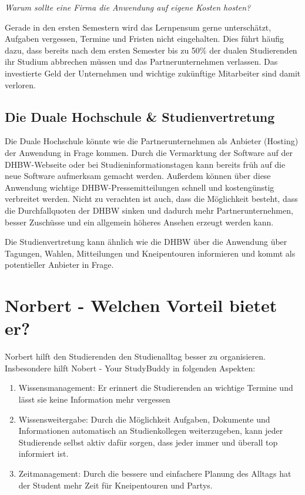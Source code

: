 \textit{Warum sollte eine Firma die Anwendung auf eigene Kosten hosten?}

Gerade in den ersten Semestern wird das Lernpensum gerne unterschätzt, Aufgaben vergessen, Termine und Fristen nicht eingehalten. Dies führt häufig dazu, dass bereits nach dem ersten Semester bis zu 50\% der dualen Studierenden ihr Studium abbrechen müssen und das Partnerunternehmen verlassen. Das investierte Geld der Unternehmen und wichtige zukünftige Mitarbeiter sind damit verloren.

\subsection{Die Duale Hochschule \& Studienvertretung}
Die Duale Hochschule könnte wie die Partnerunternehmen als Anbieter (Hosting) der Anwendung in Frage kommen. Durch die Vermarktung der Software auf der DHBW-Webseite oder bei Studieninformationstagen kann bereits früh auf die neue Software aufmerksam gemacht werden. Außerdem können über diese Anwendung wichtige DHBW-Pressemitteilungen schnell und kostengünstig verbreitet werden. Nicht zu verachten ist auch, dass die Möglichkeit besteht, dass die Durchfallquoten der DHBW sinken und dadurch mehr Partnerunternehmen, besser Zuschüsse und ein allgemein höheres Ansehen erzeugt werden kann.

Die Studienvertretung kann ähnlich wie die DHBW über die Anwendung über Tagungen, Wahlen, Mitteilungen und Kneipentouren informieren und kommt als potentieller Anbieter in Frage.

\section{Norbert - Welchen Vorteil bietet er?}
Norbert hilft den Studierenden den Studienalltag besser zu organisieren. Insbesondere hilft Nobert - Your StudyBuddy in folgenden Aspekten:
\begin{enumerate}
	\item Wissensmanagement: Er erinnert die Studierenden an wichtige Termine und lässt sie keine Information mehr vergessen
	\item Wissensweitergabe: Durch die Möglichkeit Aufgaben, Dokumente und Informationen automatisch an Studienkollegen weiterzugeben, kann jeder Studierende selbst aktiv dafür sorgen, dass jeder immer und überall top informiert ist.
	\item Zeitmanagement: Durch die bessere und einfachere Planung des Alltags hat der Student mehr Zeit für Kneipentouren und Partys.	
\end{enumerate}

